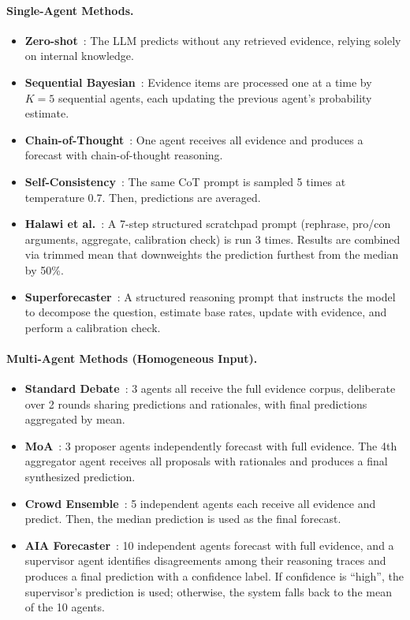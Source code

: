 \documentclass[11pt]{article}
\theoremstyle{plain}
\theoremstyle{definition}
\begin{document}
\paragraph{ Single-Agent Methods.}
\begin{itemize}
    \item \textbf{Zero-shot}~\citep{kojima2022large}: The LLM predicts without any retrieved evidence, relying solely on internal knowledge.
    \item \textbf{Sequential Bayesian}~\citep{shi2023language}: Evidence items are processed one at a time by $K{=}5$ sequential agents, each updating the previous agent's probability estimate.
    \item \textbf{Chain-of-Thought}~\citep{wei2022chain}: One agent receives all evidence and produces a forecast with chain-of-thought reasoning.
    \item \textbf{Self-Consistency}~\citep{wangself}: The same CoT prompt is sampled 5 times at temperature 0.7. Then, predictions are averaged.
    \item \textbf{Halawi et al.}~\citep{halawi2024approaching}: A 7-step structured scratchpad prompt (rephrase, pro/con arguments, aggregate, calibration check) is run 3 times. Results are combined via trimmed mean that downweights the prediction furthest from the median by 50\%.
    \item \textbf{Superforecaster}~\citep{karger2024forecastbench}: A structured reasoning prompt that instructs the model to decompose the question, estimate base rates, update with evidence, and perform a calibration check.
\end{itemize}

\paragraph{ Multi-Agent Methods (Homogeneous Input).}
\begin{itemize}
    \item \textbf{Standard Debate}~\citep{du2023improving}: 3 agents all receive the full evidence corpus, deliberate over 2 rounds sharing predictions and rationales, with final predictions aggregated by mean.
    \item \textbf{MoA}~\citep{wangmixture}: 3 proposer agents independently forecast with full evidence. The 4th aggregator agent receives all proposals with rationales and produces a final synthesized prediction.
    \item \textbf{Crowd Ensemble}~\citep{schoenegger2024wisdom}: 5 independent agents each receive all evidence and predict. Then, the median prediction is used as the final forecast.
    \item \textbf{AIA Forecaster}~\citep{alur2025aia}: 10 independent agents forecast with full evidence, and a supervisor agent identifies disagreements among their reasoning traces and produces a final prediction with a confidence label. If confidence is ``high'', the supervisor's prediction is used; otherwise, the system falls back to the mean of the 10 agents.
\end{itemize}
\end{document}
